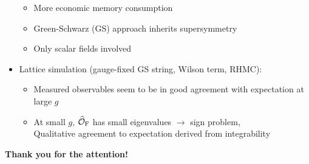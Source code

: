 \documentclass{beamer}
\begin{document}
\begin{frame}
\begin{itemize}
\begin{itemize}
\item More economic memory consumption 
\item Green-Schwarz (GS) approach inherits supersymmetry
\item Only scalar fields involved
\end{itemize}
\item<2-> Lattice simulation (gauge-fixed GS string, Wilson term, RHMC):
\begin{itemize}
\item Measured observables seem to be in good agreement with expectation at large $g$
\item At small $g$, $\hat{\mathcal{O}}_{\rm F}$ has small eigenvalues $\to$ sign problem,\\
Qualitative agreement to expectation derived from integrability
\end{itemize}
\end{itemize}
\end{frame}

\begin{frame}
\begin{center}
{\Huge \color{hublue} \bf Thank you for the attention!}
\end{center}
\end{frame}
\end{document}
